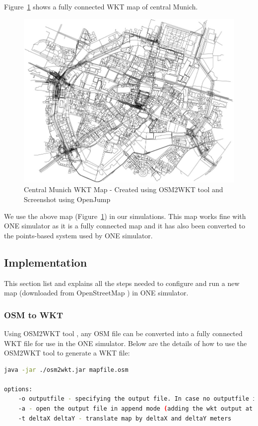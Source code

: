 	\newpage
	Figure~\ref{fig:central-munich-wkt} shows a fully connected WKT map of central Munich.
	\vspace{6mm}
	\begin{figure}[H]
		\centering
		\includegraphics[scale=0.45]{./figures/central-munich-wkt}
		\caption{Central Munich WKT Map - Created using OSM2WKT tool \cite{mayer2010osm} and Screenshot using OpenJump \cite{openjump}}
		\label{fig:central-munich-wkt}
	\end{figure}
	\vspace{3mm}
We use the above map (Figure~\ref{fig:central-munich-wkt}) in our simulations. This map works fine with ONE simulator as it is a fully connected map and it has also been converted to the points-based system used by ONE simulator.
\subsection{Implementation}
This section list and explains all the steps needed to configure and run a new map (downloaded from OpenStreetMap \cite{openstreetmap}) in ONE simulator.
\subsubsection{OSM to WKT}
Using OSM2WKT tool \cite{mayer2010osm}, any OSM file can be converted into a fully connected WKT file for use in the ONE simulator. Below are the details of how to use the OSM2WKT tool \cite{mayer2010osm} to generate a WKT file:\newline

\begin{lstlisting}[language=bash]
java -jar ./osm2wkt.jar mapfile.osm

options:
	-o outputfile - specifying the output file. In case no outputfile is mentioned, .wkt is appended to the name of input file.
	-a - open the output file in append mode (adding the wkt output at the end of the output file)
	-t deltaX deltaY - translate map by deltaX and deltaY meters
\end{lstlisting}

